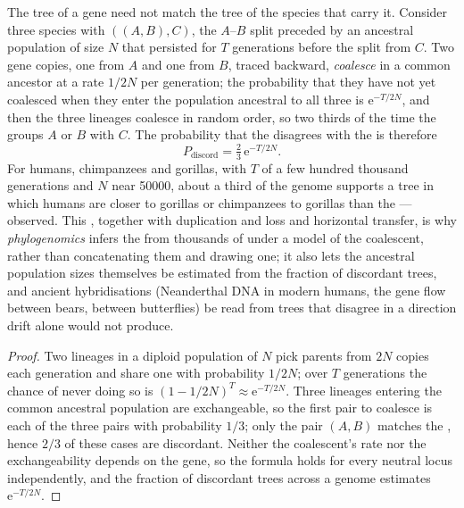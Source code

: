 \begin{proposition}\label{prop:b3:molecular-evolution:ils}
The tree of a gene need not match the tree of the species that carry
it. Consider three species with  $((A,B),C)$, the $A$--$B$
split preceded by an ancestral population of size $N$ that persisted
for $T$ generations before the split from $C$. Two gene copies, one from
$A$ and one from $B$, traced backward, \emph{coalesce} in a common
ancestor at a rate $1/2N$ per generation; the probability that they
have not yet coalesced when they enter the population ancestral to all
three is $\mathrm{e}^{-T/2N}$, and then the three lineages coalesce in
random order, so two thirds of the time the  groups $A$ or $B$
with $C$. The probability that the  disagrees with the  is therefore
\[
P_{\text{discord}} = \tfrac{2}{3}\,\mathrm{e}^{-T/2N} .
\]
For humans, chimpanzees and gorillas, with $T$ of a few hundred
thousand generations and $N$ near \num{50000}, about a third of the
genome supports a tree in which humans are closer to gorillas or
chimpanzees to gorillas than the  --- observed. This
\emph{}, together with duplication and loss
and horizontal transfer, is why \emph{phylogenomics} infers the  from thousands of  under a model of the coalescent,
rather than concatenating them and drawing one; it also lets the
ancestral population sizes themselves be estimated from the fraction of
discordant trees, and ancient hybridisations (Neanderthal DNA in modern
humans, the gene flow between bears, between butterflies) be read from
trees that disagree in a direction drift alone would not produce.
\end{proposition}
\begin{proof}
Two lineages in a diploid population of $N$ pick parents from $2N$
copies each generation and share one with probability $1/2N$; over $T$
generations the chance of never doing so is $(1 - 1/2N)^{T} \approx
\mathrm{e}^{-T/2N}$. Three lineages entering the common ancestral
population are exchangeable, so the first pair to coalesce is each of
the three pairs with probability $1/3$; only the pair $(A,B)$ matches
the , hence $2/3$ of these cases are discordant. Neither
the coalescent's rate nor the exchangeability depends on the gene, so
the formula holds for every neutral locus independently, and the
fraction of discordant trees across a genome estimates
$\mathrm{e}^{-T/2N}$.
\end{proof}

